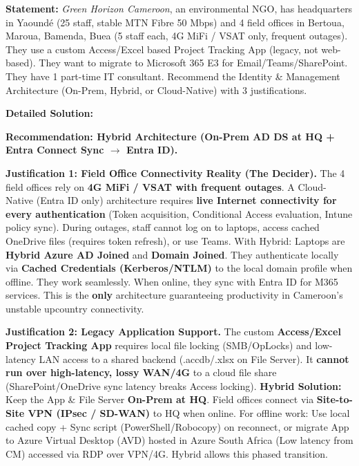 \documentclass[11pt]{article}
\begin{document}
\begin{exoresolu}
\textbf{Statement:}
\textit{Green Horizon Cameroon}, an environmental NGO, has headquarters in Yaoundé (25 staff, stable MTN Fibre 50 Mbps) and 4 field offices in Bertoua, Maroua, Bamenda, Buea (5 staff each, 4G MiFi / VSAT only, frequent outages). They use a custom Access/Excel based Project Tracking App (legacy, not web-based). They want to migrate to Microsoft 365 E3 for Email/Teams/SharePoint. They have 1 part-time IT consultant. Recommend the Identity \& Management Architecture (On-Prem, Hybrid, or Cloud-Native) with 3 justifications.

\tcblower
\textbf{Detailed Solution:}

\noindent\textbf{Recommendation: \textbf{Hybrid Architecture (On-Prem AD DS at HQ + Entra Connect Sync $\rightarrow$ Entra ID)}.}

\noindent\textbf{Justification 1: Field Office Connectivity Reality (The Decider).}
The 4 field offices rely on \textbf{4G MiFi / VSAT with frequent outages}. A Cloud-Native (Entra ID only) architecture requires \textbf{live Internet connectivity for every authentication} (Token acquisition, Conditional Access evaluation, Intune policy sync). During outages, staff cannot log on to laptops, access cached OneDrive files (requires token refresh), or use Teams. With Hybrid: Laptops are \textbf{Hybrid Azure AD Joined} and \textbf{Domain Joined}. They authenticate locally via \textbf{Cached Credentials (Kerberos/NTLM)} to the local domain profile when offline. They work seamlessly. When online, they sync with Entra ID for M365 services. This is the \textbf{only} architecture guaranteeing productivity in Cameroon's unstable upcountry connectivity.

\noindent\textbf{Justification 2: Legacy Application Support.}
The custom \textbf{Access/Excel Project Tracking App} requires local file locking (SMB/OpLocks) and low-latency LAN access to a shared backend (.accdb/.xlsx on File Server). It \textbf{cannot run over high-latency, lossy WAN/4G} to a cloud file share (SharePoint/OneDrive sync latency breaks Access locking).
\textbf{Hybrid Solution:} Keep the App \& File Server \textbf{On-Prem at HQ}. Field offices connect via \textbf{Site-to-Site VPN (IPsec / SD-WAN)} to HQ when online. For offline work: Use local cached copy + Sync script (PowerShell/Robocopy) on reconnect, or migrate App to Azure Virtual Desktop (AVD) hosted in Azure South Africa (Low latency from CM) accessed via RDP over VPN/4G. Hybrid allows this phased transition.


\end{exoresolu}
\end{document}
